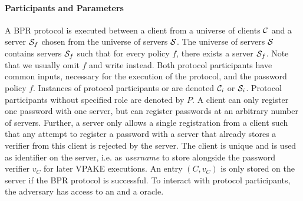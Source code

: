 \paragraph{Participants and Parameters}
A \ac{BPR} protocol is executed between a client \Client from a universe of clients $\mathcal{C}$ and a server $\mathcal{S}_f$ chosen from the universe of servers $\mathcal{S}$.
The universe of servers $\mathcal{S}$ contains servers $\mathcal{S}_f$ such that for every policy $f$, there exists a server $\mathcal{S}_f$.
Note that we usually omit $f$ and write \Server instead.
Both protocol participants have common inputs, necessary for the execution of the protocol, and the password policy $f$.
Instances of protocol participants \Client or \Server are denoted $\mathcal{C}_i$ or $\mathcal{S}_i$. %
Protocol participants without specified role are denoted by $P$.
A client can only register one password with one server, but can register passwords at an arbitrary number of servers.
Further, a server only allows a single registration from a client such that any attempt to register a password with a server that already stores a verifier from this client is rejected by the server.
The client \Client is unique and is used as identifier on the server, i.e. as \emph{username} to store alongside the password verifier $v_C$ for later \ac{VPAKE} executions.
An entry $(C,v_C)$ is only stored on the server if the \ac{BPR} protocol is successful.
%
%
%
To interact with protocol participants, the adversary has access to an \Execute and a \Send oracle.

